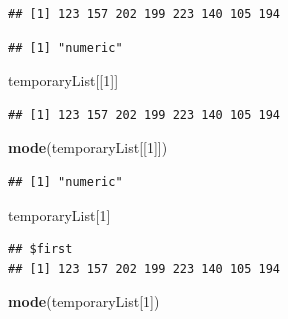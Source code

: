 \documentclass[
]{krantz}
\newenvironment{Shaded}{\begin{snugshade}}{\end{snugshade}}
\newcommand{\DecValTok}[1]{\textcolor[rgb]{0.00,0.00,0.81}{#1}}
\newcommand{\KeywordTok}[1]{\textcolor[rgb]{0.13,0.29,0.53}{\textbf{#1}}}
\newcommand{\NormalTok}[1]{#1}
\newcommand{\OperatorTok}[1]{\textcolor[rgb]{0.81,0.36,0.00}{\textbf{#1}}}
\begin{document}
\begin{Shaded}
\end{Shaded}

\begin{verbatim}
## [1] 123 157 202 199 223 140 105 194
\end{verbatim}

\begin{Shaded}
\end{Shaded}

\begin{verbatim}
## [1] "numeric"
\end{verbatim}

\begin{Shaded}
\begin{Highlighting}[]
\NormalTok{temporaryList[[}\DecValTok{1}\NormalTok{]]}
\end{Highlighting}
\end{Shaded}

\begin{verbatim}
## [1] 123 157 202 199 223 140 105 194
\end{verbatim}

\begin{Shaded}
\begin{Highlighting}[]
\KeywordTok{mode}\NormalTok{(temporaryList[[}\DecValTok{1}\NormalTok{]])}
\end{Highlighting}
\end{Shaded}

\begin{verbatim}
## [1] "numeric"
\end{verbatim}

\begin{Shaded}
\begin{Highlighting}[]
\NormalTok{temporaryList[}\DecValTok{1}\NormalTok{]}
\end{Highlighting}
\end{Shaded}

\begin{verbatim}
## $first
## [1] 123 157 202 199 223 140 105 194
\end{verbatim}

\begin{Shaded}
\begin{Highlighting}[]
\KeywordTok{mode}\NormalTok{(temporaryList[}\DecValTok{1}\NormalTok{])}
\end{Highlighting}
\end{Shaded}
\end{document}
